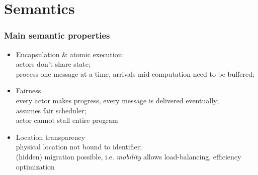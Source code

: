 \section{Semantics}
\begin{frame}
\frametitle{Main semantic properties}
\begin{itemize}
	\item Encapsulation \& atomic execution:\\	
	actors don't share state; \\
	process one message at a time, arrivals mid-computation need to be buffered;
	\item Fairness\\
	every actor makes progress, every message is delivered eventually; \\
	assumes fair scheduler; \\
	\textrightarrow actor cannot stall entire program
	\item Location transparency\\
	physical location not bound to identifier; \\
	\textrightarrow (hidden) migration possible, i.e. {\it mobility}
	\textrightarrow allows load-balancing, efficiency optimization
\end{itemize}
\end{frame}

